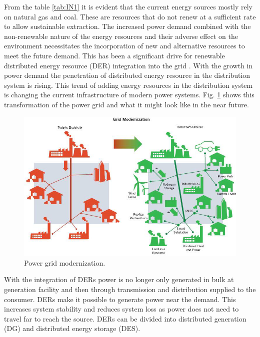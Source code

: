 From the table \ref{tab:IN1} it is evident that the current energy sources mostly rely on natural gas and coal. These are resources that do not renew at a sufficient rate to allow sustainable extraction. The increased power demand combined with the non-renewable nature of the energy resources and their adverse effect on the environment necessitates the incorporation of new and alternative resources to meet the future demand. This has been a significant drive for renewable distributed energy resource (DER) integration into the grid \cite{khan2009review,bignucolo2008radial,series2009microgrids}. With the growth in power demand the penetration of distributed energy resource in the distribution system is rising. This trend of adding energy resources in the distribution system is changing the current infrastructure of modern power systems. Fig. \ref{fig:NEW_GRID} shows this transformation of the power grid and what it might look like in the near future. 

\begin{figure}[!h]
\centering
\includegraphics[width=0.85\linewidth]{figs/NEW_GRID.png}
\caption[Power grid modernization.]{Power grid modernization.\cite{NEW_GRID}}
\label{fig:NEW_GRID}
\end{figure}

With the integration of DERs power is no longer only generated in bulk at generation facility and then through transmission and distribution supplied to the consumer. DERs make it possible to generate power near the demand. This increases system stability and reduces system loss as power does not need to travel far to reach the source. DERs can be divided into distributed generation (DG) and distributed energy storage (DES). 

